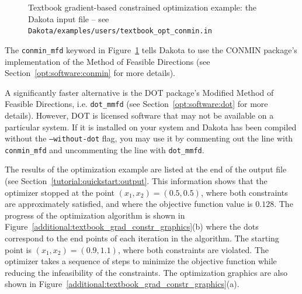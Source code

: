 \begin{figure}[ht!]
  \centering
  \begin{bigbox}
    \begin{small}
    \end{small}
  \end{bigbox}
  \caption{Textbook gradient-based constrained optimization example:
    the Dakota input file --
see \texttt{Dakota/examples/users/textbook\_opt\_conmin.in} }
  \label{additional:textbook_grad_constr}
\end{figure}

The \texttt{conmin\_mfd} keyword in Figure~\ref{additional:textbook_grad_constr} 
tells Dakota to use the CONMIN package's implementation of the
Method of Feasible Directions (see Section~\ref{opt:software:conmin} 
for more details). 

A significantly faster alternative is the DOT package's 
Modified Method of Feasible Directions, i.e. \texttt{dot\_mmfd} (see 
Section~\ref{opt:software:dot} for more details). However, DOT is 
licensed software that may not be available on a particular system. If it 
is installed on your system and Dakota has been compiled without the 
\texttt{--without-dot} flag, you may use it by commenting out the line with
\texttt{conmin\_mfd} and uncommenting the line with \texttt{dot\_mmfd}.

The results of the optimization example are listed at the end of
the output file (see Section~\ref{tutorial:quickstart:output}.
This information shows that the
optimizer stopped at the point $(x_1,x_2) = (0.5,0.5)$, where both
constraints are approximately satisfied, and where the objective function value is
$0.128$. The progress of the optimization algorithm is shown in
Figure~\ref{additional:textbook_grad_constr_graphics}(b) where the
dots correspond to the end points of each iteration in the algorithm. The
starting point is $(x_1,x_2) = (0.9,1.1)$, where both constraints
are violated. The optimizer takes a
sequence of steps to minimize the objective function while reducing
the infeasibility of the constraints.
The optimization graphics are also shown in
Figure~\ref{additional:textbook_grad_constr_graphics}(a).

